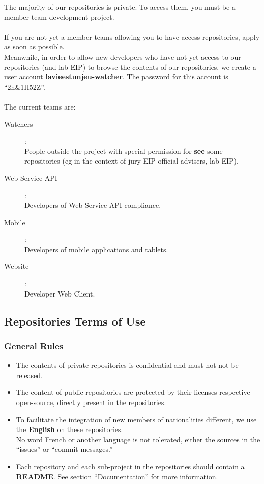 \documentclass{life-fr}
\begin{document}
The majority of our repositories is private. To access them, you must be a member
team development project.\\
\\
If you are not yet a member teams allowing you to have access
repositories, apply as soon as possible.\\
Meanwhile, in order to allow new developers who have not yet
access to our repositories (and lab EIP) to browse the contents of our repositories,
we create a user account \textbf{lavieestunjeu-watcher}. The
password for this account is ``2h\&1H52Z''.\\
\\
The current teams are:
\begin{description}
  \item [Watchers]: \\
    People outside the project with special permission
    for \textbf{see} some repositories (eg in the context of jury
    EIP official advisers, lab EIP).
  \item [Web Service API]: \\
    Developers of Web Service API compliance.
  \item [Mobile]: \\
    Developers of mobile applications and tablets.
  \item [Website]: \\
    Developer Web Client.
\end{description}

\subsection{Repositories Terms of Use}

\subsubsection{General Rules}

\begin{itemize}
  \item The contents of private repositories is confidential and must not
    not be released.
  \item The content of public repositories are protected by their licenses
    respective open-source, directly present in the repositories.
  \item To facilitate the integration of new members of nationalities
    different, we use the \textbf{English} on these repositories.\\
    No word French or another language is not tolerated, either
    the sources in the ``issues'' or ``commit messages.''
  \item Each repository and each sub-project in the repositories should contain
    a \textbf{README}. See section ``Documentation'' for
    more information.
\end{itemize}
\end{document}

